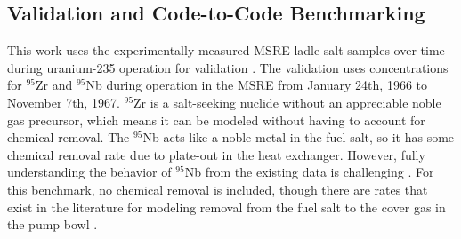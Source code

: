 \documentclass{style/nseJournal}
\begin{document}


\subsection{Validation and Code-to-Code Benchmarking}

This work uses the experimentally measured MSRE ladle salt samples over time during uranium-235 operation for validation \cite{compere1975fission}.
The validation uses concentrations for $^{95}$Zr and $^{95}$Nb during operation in the MSRE from January 24th, 1966 to November 7th, 1967.
$^{95}$Zr is a salt-seeking nuclide without an appreciable noble gas precursor, which means it can be modeled without having to account for chemical removal.
The $^{95}$Nb acts like a noble metal in the fuel salt, so it has some chemical removal rate due to plate-out in the heat exchanger.
However, fully understanding the behavior of $^{95}$Nb from the existing data is challenging \cite{cheng2021distribution}.
For this benchmark, no chemical removal is included, though there are rates that exist in the literature for modeling removal from the fuel salt to the cover gas in the pump bowl \cite{shahbazi2024modeling}.
\end{document}
